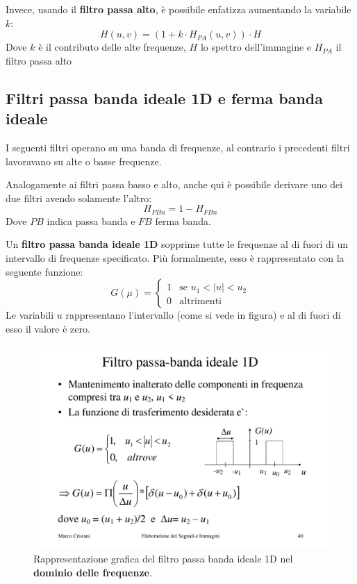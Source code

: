 \documentclass[a4paper]{article}
\begin{document}
	\noindent
	Invece, usando il \textbf{filtro passa alto}, è possibile enfatizza aumentando la variabile $k$:
	\begin{equation*}
		H\left(u,v\right) = \left(1 + k \cdot H_{PA}\left(u,v\right)\right) \cdot H
	\end{equation*}
	Dove $k$ è il contributo delle alte frequenze, $H$ lo spettro dell'immagine e $H_{PA}$ il filtro passa alto\newpage
	
	\subsection{Filtri passa banda ideale 1D e ferma banda ideale}
	
	I seguenti filtri operano su una banda di frequenze, al contrario i precedenti filtri lavoravano su alte o basse frequenze.\newline
	
	\noindent
	Analogamente ai filtri passa basso e alto, anche qui è possibile derivare uno dei due filtri avendo solamente l'altro:
	\begin{equation*}
		H_{PBn} = 1 - H_{FBn}
	\end{equation*}
	Dove $PB$ indica passa banda e $FB$ ferma banda.\newline
	
	\noindent
	Un \textcolor{Red3}{\textbf{filtro passa banda ideale 1D}} sopprime tutte le frequenze al di fuori di un intervallo di frequenze specificato. Più formalmente, esso è rappresentato con la seguente funzione:
	\begin{equation*}
		G\left(\mu\right) = \begin{cases}
			1	& \text{se } u_{1} < \left|u\right| < u_{2} \\
			0	& \text{altrimenti}
		\end{cases}
	\end{equation*}
	Le variabili $u$ rappresentano l'intervallo (come si vede in figura) e al di fuori di esso il valore è zero.
	\begin{figure}[!htp]
		\centering
		\includegraphics[width=.5\textwidth]{img/filtro_passa_banda_ideale.pdf}
		\caption{Rappresentazione grafica del filtro passa banda ideale 1D nel \textbf{dominio delle frequenze}.}
	\end{figure}
	
\end{document}
